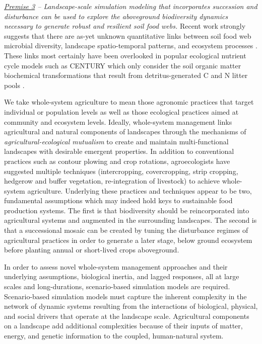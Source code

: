\documentclass[12pt, letterpaper]{article}
\begin{document}
\textit{\underline{Premise 3} -- Landscape-scale simulation modeling that incorporates succession and disturbance can be used to explore the aboveground biodiversity dynamics necessary to generate robust and resilient soil food webs.} Recent work strongly suggests that there are as-yet unknown quantitative links between soil food web microbial diversity, landscape spatio-temporal patterns, and ecosystem processes \citep{rygiewicz_soil_2010, compant_stephane_plant_2010, prosser_role_2007}. These links most certainly have been overlooked in popular ecological nutrient cycle models such as CENTURY which only consider the soil organic matter biochemical transformations that result from detritus-generated C and N litter pools \citep{smith_evaluation_1997, de_vries_soil_2013, kirschbaum_modelling_2002, roose_mathematical_2008}.

We take whole-system agriculture to mean those agronomic practices that target individual or population levels as well as those ecological practices aimed at community and ecosystem levels. Ideally, whole-system management links agricultural and natural components of landscapes through the mechanisms of \textit{agricultural-ecological mutualism} to create and maintain multi-functional landscapes with desirable emergent properties. In addition to conventional practices such as contour plowing and crop rotations, agroecologists have suggested multiple techniques (intercropping, covercropping, strip cropping, hedgerow and buffer vegetation, re-integration of livestock) to achieve whole-system agriculture. Underlying these practices and techniques appear to be two, fundamental assumptions which may indeed hold keys to sustainable food production systems. The first is that biodiversity should be reincorporated into agricultural systems and augmented in the surrounding landscapes. The second is that a successional mosaic can be created by tuning the disturbance regimes of agricultural practices in order to generate a later stage, below ground ecosystem before planting annual or short-lived crops aboveground. 

In order to assess novel whole-system management approaches and their underlying assumptions, biological inertia, and lagged responses, all at large scales and long-durations, scenario-based simulation models are required. Scenario-based simulation models must capture the inherent complexity in the network of dynamic systems resulting from the interactions of biological, physical, and social drivers that operate at the landscape scale. Agricultural components on a landscape add additional complexities because of their inputs of matter, energy, and genetic information to the coupled, human-natural system. 
\end{document}
